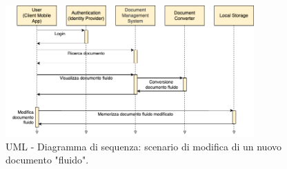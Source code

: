 \begin{figure}[H]
\centering
\includegraphics[width=0.85\textwidth]{img/tesi-2-Use-case2.drawio.png}
\caption{UML - Diagramma di sequenza: scenario di modifica di un nuovo documento "fluido".}
\end{figure}

